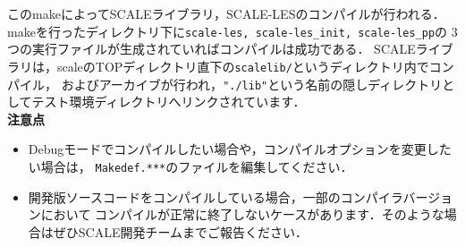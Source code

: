 このmakeによってSCALEライブラリ，SCALE-LESのコンパイルが行われる．
makeを行ったディレクトリ下に\verb|scale-les, scale-les_init, scale-les_pp|の
3つの実行ファイルが生成されていればコンパイルは成功である．
SCALEライブラリは，scaleのTOPディレクトリ直下の\verb|scalelib/|というディレクトリ内でコンパイル，
およびアーカイブが行われ，\verb|"./lib"|という名前の隠しディレクトリとしてテスト環境ディレクトリへリンクされています．\\


{\bf 注意点}
\begin{itemize}
\item Debugモードでコンパイルしたい場合や，コンパイルオプションを変更したい場合は，
      \verb|Makedef.***|のファイルを編集してください．
\item 開発版ソースコードをコンパイルしている場合，一部のコンパイラバージョンにおいて
      コンパイルが正常に終了しないケースがあります．そのような場合はぜひSCALE開発チームまでご報告ください．
\end{itemize}





